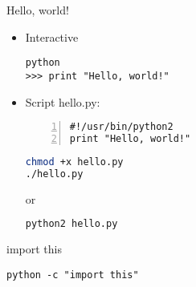 \documentclass[hyperref={pdftex,unicode}]{beamer}
\begin{document}
\begin{frame}[fragile]{Hello, world!}
  \begin{itemize}
  \item Interactive
    \begin{lstlisting}
python
>>> print "Hello, world!"
    \end{lstlisting}
  \item Script hello.py:
    \begin{lstlisting}[numbers=left]
#!/usr/bin/python2
print "Hello, world!"
    \end{lstlisting}

  \begin{minipage}{0.4\linewidth}
     \begin{lstlisting}[language=bash]
chmod +x hello.py
./hello.py
     \end{lstlisting}
   \end{minipage}
   \hfill or \hfill
   \begin{minipage}{0.4\linewidth}
     \begin{lstlisting}[language=bash]
python2 hello.py
     \end{lstlisting}
   \end{minipage}

  \end{itemize}
\end{frame}

\begin{frame}[fragile]{import this}
  \begin{center}
    \texttt{python -c "import this"}
  \end{center}
\end{frame}
\end{document}
